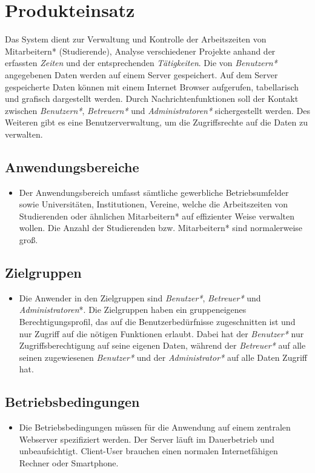 \section{Produkteinsatz}
Das System dient zur Verwaltung und Kontrolle der Arbeitszeiten von Mitarbeitern* (Studierende), Analyse verschiedener Projekte anhand der erfassten \emph{Zeiten} und der entsprechenden \emph{Tätigkeiten}.
Die von \emph{Benutzern*} angegebenen Daten werden auf einem Server gespeichert. Auf dem Server gespeicherte Daten können mit einem Internet Browser aufgerufen, tabellarisch und grafisch dargestellt werden.
Durch Nachrichtenfunktionen soll der Kontakt zwischen \emph{Benutzern*}, \emph{Betreuern*} und \emph{Administratoren*} sichergestellt werden.
Des Weiteren gibt es eine Benutzerverwaltung, um die Zugriffsrechte auf die Daten zu verwalten.
\subsection{Anwendungsbereiche}
\begin{itemize}
	\item Der Anwendungsbereich umfasst sämtliche gewerbliche Betriebsumfelder sowie Universitäten, Institutionen, Vereine,
	welche die Arbeitszeiten von Studierenden oder ähnlichen Mitarbeitern* auf effizienter Weise verwalten wollen. Die Anzahl der Studierenden bzw. Mitarbeitern* sind normalerweise groß.
\end{itemize}

\subsection{Zielgruppen}
\begin{itemize}
	\item Die Anwender in den Zielgruppen sind \emph{Benutzer*}, \emph{Betreuer*} und \emph{Administratoren}*.
	Die Zielgruppen haben ein gruppeneigenes Berechtigungsprofil, das auf die Benutzerbedürfnisse zugeschnitten ist und nur Zugriff auf die nötigen Funktionen erlaubt.
	Dabei hat der \emph{Benutzer*} nur Zugriffsberechtigung auf seine eigenen Daten, während der \emph{Betreuer*} auf alle seinen zugewiesenen \emph{Benutzer*} und der \emph{Administrator*} auf alle Daten Zugriff hat.
\end{itemize}

\subsection{Betriebsbedingungen}
\begin{itemize}
	\item Die Betriebsbedingungen müssen für die Anwendung auf einem zentralen Webserver spezifiziert werden. Der Server läuft im Dauerbetrieb und unbeaufsichtigt.
	Client-User brauchen einen normalen Internetfähigen Rechner oder Smartphone.
\end{itemize}
